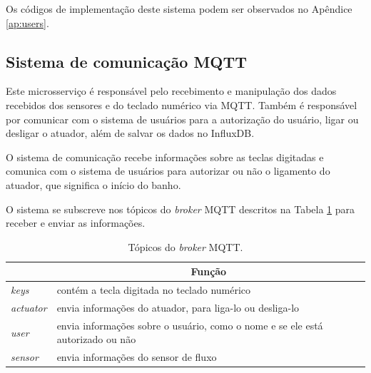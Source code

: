 Os códigos de implementação deste sistema podem ser observados no Apêndice \ref{ap:users}.

\subsection{Sistema de comunicação MQTT} \label{sec:sistemacomunicacao}

Este microsserviço é responsável pelo recebimento e manipulação dos dados recebidos dos sensores e do teclado numérico via MQTT. Também é responsável por comunicar com o sistema de usuários para a autorização do usuário, ligar ou desligar o atuador, além de salvar os dados no InfluxDB.

O sistema de comunicação recebe informações sobre as teclas digitadas e comunica com o sistema de usuários para autorizar ou não o ligamento do atuador, que significa o início do banho.

O sistema se subscreve nos tópicos do \textit{broker} MQTT descritos na Tabela \ref{tab:topics} para receber e enviar as informações.



\begin{table}[]
	\centering
	\begin{tabular}{|l|l|}
		\hline
		\rowcolor[HTML]{ECF4FF} 
		\multicolumn{1}{|c|}{\cellcolor[HTML]{ECF4FF}Tópico} & \multicolumn{1}{c|}{\cellcolor[HTML]{ECF4FF}Função}                        \\ \hline
		\textit{keys}                                        & contém a tecla digitada no teclado numérico                                    \\ \hline
		\textit{actuator}                                    & envia informações do atuador, para liga-lo ou desliga-lo                       \\ \hline
		\textit{user}                                        & envia informações sobre o usuário, como o nome e se ele está autorizado ou não \\ \hline
		\textit{sensor}                                      & envia informações do sensor de fluxo                                           \\ \hline
	\end{tabular}
	\caption{Tópicos do \textit{broker} MQTT.}
	\label{tab:topics}
\end{table}


